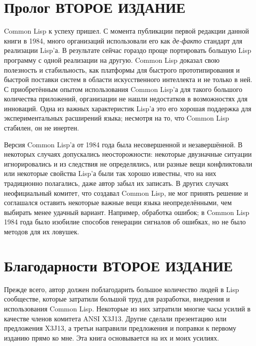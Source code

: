 \else

\chapter*{Пролог ВТОРОЕ ИЗДАНИЕ}

Common Lisp к успеху пришел. С момента публикации первой редакции
данной книги в 1984, много организаций использовали его как \emph{де-факто}
стандарт для реализации Lisp'а. В результате сейчас гораздо 
проще портировать большую Lisp программу с одной реализации на
другую. Common Lisp доказал свою полезность и стабильность, как
платформы для быстрого прототипирования и быстрой поставки систем в
области искусственного интеллекта и не только в ней. С приобретённым
опытом использования Common Lisp'а для такого большого количества
приложений, организации не нашли недостатков в возможностях для
инноваций. Одна из важных характеристик Lisp'а это его хорошая
поддержка для экспериментальных расширений языка; несмотря на то, что
Common Lisp стабилен, он не инертен.


Версия Common Lisp'а от 1984 года была несовершенной и
незавершённой. В некоторых случаях допускались неосторожности:
некоторые двузначные ситуации игнорировались и из следствия не
определялись, или разные вещи конфликтовали или некоторые свойства
Lisp'а были так хорошо известны, что на них традиционно
полагались, даже автор забыл их записать. В других случаях
неофициальный комитет, что создавал Common Lisp, не мог принять
решение и соглашался оставить некоторые важные вещи языка
неопределёнными, чем выбирать менее удачный вариант. Например,
обработка ошибок; в Common Lisp 1984 года было изобилие способов
генерации сигналов об ошибках, но не было методов для их ловушек. 


\chapter*{Благодарности ВТОРОЕ ИЗДАНИЕ}

Прежде всего, автор должен поблагодарить большое количество людей в Lisp
сообществе, которые затратили большой труд для разработки, внедрения и
использования Common Lisp. Некоторые из них затратили многие часы
усилий в качестве членов комитета ANSI X3J13. Другие
сделали презентацию или предложения X3J13, а третьи
направили предложения и поправки к первому изданию прямо ко мне.
Эта книга основывается на их и моих усилиях.



